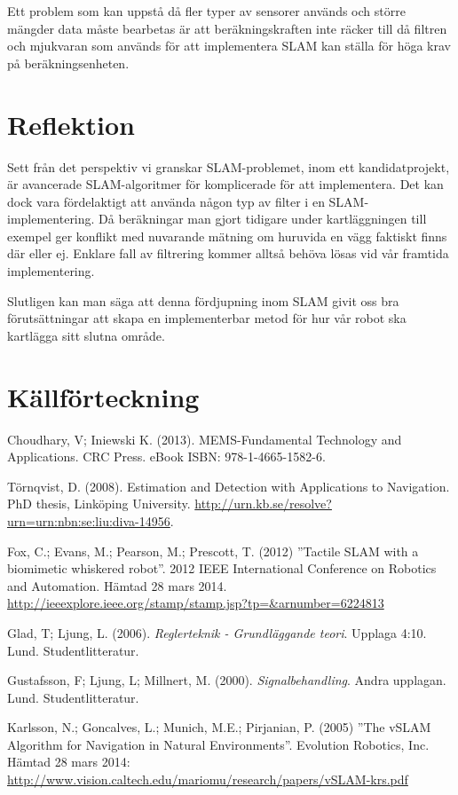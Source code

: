 \documentclass[a4paper,12pt,fleqn]{article}
\begin{document}
Ett problem som kan uppstå då fler typer av sensorer används och större mängder data måste bearbetas är att beräkningskraften inte räcker till då filtren och mjukvaran som används för att implementera SLAM kan ställa för höga krav på beräkningsenheten.


\section{Reflektion}

Sett från det perspektiv vi granskar SLAM-problemet, inom ett kandidatprojekt, är avancerade SLAM-algoritmer för komplicerade för att implementera. Det kan dock vara fördelaktigt att använda någon typ av filter i en SLAM-implementering. Då beräkningar man gjort tidigare under kartläggningen till exempel ger konflikt med nuvarande mätning om huruvida en vägg faktiskt finns där eller ej. Enklare fall av filtrering kommer alltså behöva lösas vid vår framtida implementering. 

Slutligen kan man säga att denna fördjupning inom SLAM givit oss bra förutsättningar att skapa en implementerbar metod för hur vår robot ska kartlägga sitt slutna område. 

\newpage 
\section*{Källförteckning} 

Choudhary, V; Iniewski K. (2013). MEMS-Fundamental Technology and Applications. CRC Press.
eBook ISBN: 978-1-4665-1582-6.

Törnqvist, D. (2008). Estimation and Detection with Applications to Navigation.  PhD thesis, Linköping University. \url{http://urn.kb.se/resolve?urn=urn:nbn:se:liu:diva-14956}. 

Fox, C.; Evans, M.; Pearson, M.; Prescott, T. (2012)
''Tactile SLAM with a biomimetic whiskered robot''. 2012 IEEE International Conference on Robotics and Automation. Hämtad 28 mars 2014.
\url{http://ieeexplore.ieee.org/stamp/stamp.jsp?tp=&arnumber=6224813}

Glad, T; Ljung, L. (2006). \textit{Reglerteknik - Grundläggande teori}. Upplaga 4:10. Lund. Studentlitteratur.

Gustafsson, F; Ljung, L; Millnert, M. (2000). \textit{Signalbehandling}. Andra upplagan. Lund. Studentlitteratur.

Karlsson, N.; Goncalves, L.; Munich, M.E.; Pirjanian, P. (2005)
''The vSLAM Algorithm for Navigation in Natural Environments''. Evolution Robotics, Inc. Hämtad 28 mars 2014:
\url{http://www.vision.caltech.edu/mariomu/research/papers/vSLAM-krs.pdf}
\end{document}
